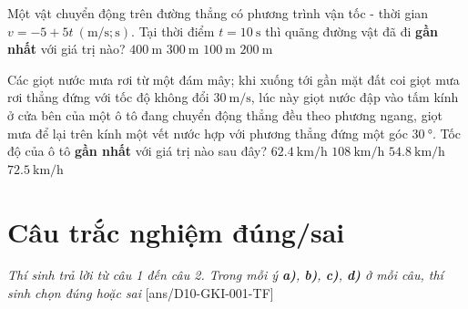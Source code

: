 \begin{ex}
	Một vật chuyển động trên đường thẳng có phương trình vận tốc - thời gian $v=-5+5t\ \left(\si{\meter/\second};\si{\second}\right)$. Tại thời điểm $t=\SI{10}{\second}$ thì quãng đường vật đã đi \textbf{gần nhất} với giá trị nào?
	\choice
	{$\SI{400}{\meter}$}
	{$\SI{300}{\meter}$}
	{$\SI{100}{\meter}$}
	{\True $\SI{200}{\meter}$}
\end{ex}


\begin{ex}
Các giọt nước mưa rơi từ một đám mây; khi xuống tới gần mặt đất	coi giọt mưa rơi thẳng đứng với tốc độ không đổi $\SI{30}{\meter/\second}$, lúc này giọt nước đập vào tấm kính ở cửa bên của một ô tô đang chuyển động thẳng đều theo phương ngang, giọt mưa để lại trên kính một vết nước hợp với phương thẳng đứng một góc $\SI{30}{\degree}$. Tốc độ của ô tô \textbf{gần nhất} với giá trị nào sau đây?
	\choice
	{\True $\SI{62.4}{\kilo\meter/\hour}$}
	{$\SI{108}{\kilo\meter/\hour}$}
	{$\SI{54.8}{\kilo\meter/\hour}$}
	{$\SI{72.5}{\kilo\meter/\hour}$}
\end{ex}


\section{Câu trắc nghiệm đúng/sai} 
\textit{Thí sinh trả lời từ câu 1 đến câu 2. Trong mỗi ý \textbf{a)}, \textbf{b)}, \textbf{c)}, \textbf{d)} ở mỗi câu, thí sinh chọn đúng hoặc sai}
\setcounter{ex}{0}
[ans/D10-GKI-001-TF]

